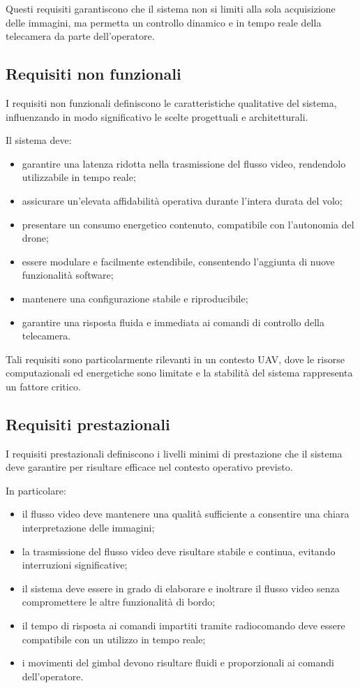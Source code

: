 Questi requisiti garantiscono che il sistema non si limiti alla sola acquisizione delle immagini, ma permetta un controllo dinamico e in tempo reale della telecamera da parte dell’operatore.

\subsection{Requisiti non funzionali}

I requisiti non funzionali definiscono le caratteristiche qualitative del sistema, influenzando in modo significativo le scelte progettuali e architetturali.

Il sistema deve:
\begin{itemize}
    \item garantire una latenza ridotta nella trasmissione del flusso video, rendendolo utilizzabile in tempo reale;
    \item assicurare un’elevata affidabilità operativa durante l’intera durata del volo;
    \item presentare un consumo energetico contenuto, compatibile con l’autonomia del drone;
    \item essere modulare e facilmente estendibile, consentendo l’aggiunta di nuove funzionalità software;
    \item mantenere una configurazione stabile e riproducibile;
    \item garantire una risposta fluida e immediata ai comandi di controllo della telecamera.
\end{itemize}

Tali requisiti sono particolarmente rilevanti in un contesto UAV, dove le risorse computazionali ed energetiche sono limitate e la stabilità del sistema rappresenta un fattore critico.

\subsection{Requisiti prestazionali}

I requisiti prestazionali definiscono i livelli minimi di prestazione che il sistema deve garantire per risultare efficace nel contesto operativo previsto.

In particolare:
\begin{itemize}
    \item il flusso video deve mantenere una qualità sufficiente a consentire una chiara interpretazione delle immagini;
    \item la trasmissione del flusso video deve risultare stabile e continua, evitando interruzioni significative;
    \item il sistema deve essere in grado di elaborare e inoltrare il flusso video senza compromettere le altre funzionalità di bordo;
    \item il tempo di risposta ai comandi impartiti tramite radiocomando deve essere compatibile con un utilizzo in tempo reale;
    \item i movimenti del gimbal devono risultare fluidi e proporzionali ai comandi dell’operatore.
\end{itemize}

